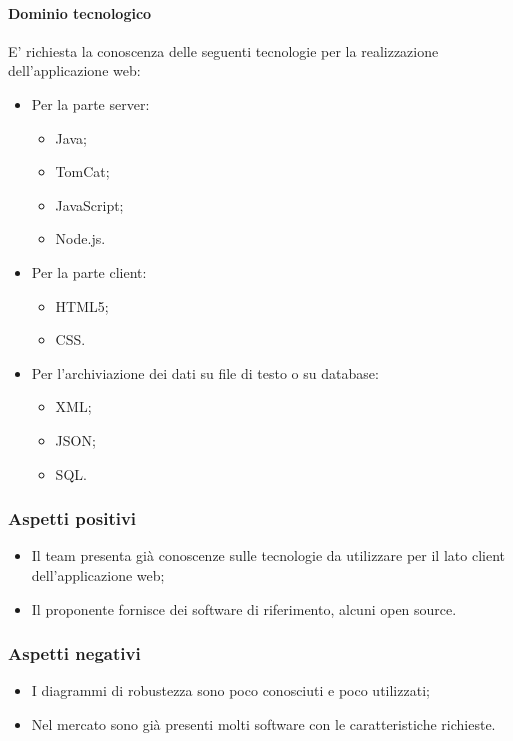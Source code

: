 			\paragraph{Dominio tecnologico} \Spazio
			E' richiesta la conoscenza delle seguenti tecnologie per la realizzazione dell'applicazione web:
				\begin{itemize}
					\item Per la parte server:
					\begin{itemize}
						\item Java;
						\item TomCat;
						\item JavaScript;
						\item Node.js.
					\end{itemize}
					\item Per la parte client:
					\begin{itemize}
						\item HTML5;
						\item CSS.
					\end{itemize}
					\item Per l'archiviazione dei dati su file di testo o su database:
					\begin{itemize}
						\item XML;
						\item JSON;
						\item SQL.
					\end{itemize}
				\end{itemize}
		\subsubsection{Aspetti positivi}
		\begin{itemize}
			\item Il team presenta già conoscenze sulle tecnologie da utilizzare per il lato client dell'applicazione web;
			\item Il proponente fornisce dei software di riferimento, alcuni open source.
		\end{itemize}
		\subsubsection{Aspetti negativi}
		\begin{itemize}
			\item I diagrammi di robustezza sono poco conosciuti e poco utilizzati;
			\item Nel mercato sono già presenti molti software con le caratteristiche richieste.
		\end{itemize}
